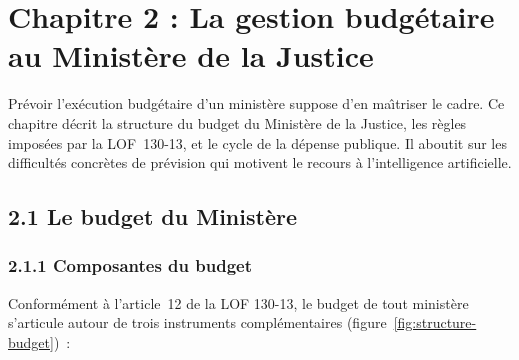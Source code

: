 ﻿
\section*{Chapitre 2 : La gestion budg\'etaire au Minist\`ere de la Justice}

\bigskip

Pr\'evoir l'ex\'ecution budg\'etaire d'un minist\`ere suppose d'en ma\^{\i}triser le cadre. Ce chapitre d\'ecrit la structure du budget du Minist\`ere de la Justice, les r\`egles impos\'ees par la LOF~130-13, et le cycle de la d\'epense publique. Il aboutit sur les difficult\'es concr\`etes de pr\'evision qui motivent le recours \`a l'intelligence artificielle.

\subsection*{2.1 \quad Le budget du Minist\`ere}

\subsubsection*{2.1.1 \quad Composantes du budget}

Conform\'ement \`a l'article~12 de la LOF 130-13, le budget de tout minist\`ere s'articule autour de trois instruments compl\'ementaires (figure~\ref{fig:structure-budget})~:

